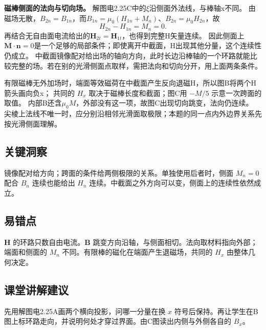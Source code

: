 \documentclass[UTF8,fontset=fandol,a4paper,11pt]{ctexart}
\newcommand{\vect}[1]{\bm{#1}}
\begin{document}
\textbf{磁棒侧面的法向与切向场。} 解图电2.25C中的$\xi$沿侧面外法线，与棒轴x不同。
由磁场无散，$B_{2n}=B_{1n}$，而$B_{1n}=\mu_0(H_{1n}+M_n)$、$B_{2n}=\mu_0H_{2n}$，故
\[
H_{2n}-H_{1n}=M_n=0.
\]
再结合无自由面电流给出的$\boldsymbol H_{2t}=\boldsymbol H_{1t}$，也得到完整H矢量连续。
因此侧面上$\boldsymbol M\cdot\boldsymbol n=0$是一个足够的局部条件；即使离开中截面，H出现其他分量，这个连续性仍成立。
中截面镜像配对给出场的轴向方向，此时长边沿棒轴的一个环路就能比较完整的场。若在别的光滑侧面点取样，需把法向和切向分开，用上面两条条件。

有限磁棒无外加场时，端面等效磁荷在中截面产生反向退磁H，所以图B将两个H箭头画向负x；
共同的 $H_x$ 取决于磁棒长度和截面；图C用 $-M/5$ 示意一次跨面的取值。
内部B还含$\mu_0M$，外部没有这一项，故图C出现切向跳变，法向仍连续。
尖棱上法线不唯一时，应分别沿相邻光滑面取极限；本题的同一点内外边界关系先按光滑侧面理解。




\subsection*{关键洞察}

镜像配对给方向；跨面的条件给两侧极限的关系。单独使用后者时，侧面 $M_n=0$ 配合 $B_n$ 连续也能给出 $H_n$ 连续。中截面之外方向可以变，侧面上的连续性依然成立。



\subsection*{易错点}

$\vect H$ 的环路只数自由电流。$\vect B$ 跳变方向沿轴，与侧面相切。法向取材料指向外部；端面和侧面的 $M_n$ 不同。有限棒的磁化在端面产生退磁场，共同的 $H_x$ 由整体几何决定。



\subsection*{课堂讲解建议}

先用解图电2.25A画两个横向投影，问哪一分量在换 $x$ 符号后保持。再让学生在B图上标环路走向，并说明何处才穿过界面。由C图读出内侧与外侧各自的 $B_x$。
\end{document}
